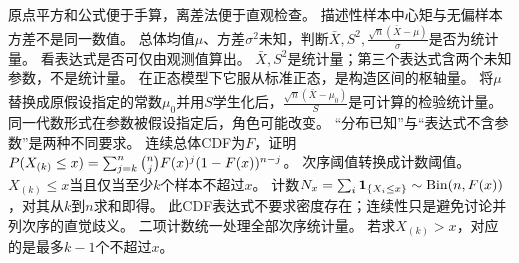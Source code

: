 {原点平方和公式便于手算，离差法便于直观检查。}
{描述性样本中心矩与无偏样本方差不是同一数值。}
{总体均值$\mu$、方差$\sigma^2$未知，判断$\bar X,S^2,\frac{\sqrt n(\bar X-\mu)}{\sigma}$是否为统计量。}
{看表达式是否可仅由观测值算出。}
{$\bar X,S^2$是统计量；第三个表达式含两个未知参数，不是统计量。
在正态模型下它服从标准正态，是构造区间的枢轴量。
将$\mu$替换成原假设指定的常数$\mu_0$并用$S$学生化后，$\frac{\sqrt n(\bar X-\mu_0)}{S}$是可计算的检验统计量。}
{同一代数形式在参数被假设指定后，角色可能改变。}
{“分布已知”与“表达式不含参数”是两种不同要求。}
{连续总体CDF为$F$，证明$P(X_{(k)}\le x)=\sum_{j=k}^n\binom njF(x)^j(1-F(x))^{n-j}$。}
{次序阈值转换成计数阈值。}
{$X_{(k)}\le x$当且仅当至少$k$个样本不超过$x$。
计数$N_x=\sum_i\mathbf1_{\{X_i\le x\}}\sim\operatorname{Bin}(n,F(x))$，对其从$k$到$n$求和即得。
此CDF表达式不要求密度存在；连续性只是避免讨论并列次序的直觉歧义。}
{二项计数统一处理全部次序统计量。}
{若求$X_{(k)}>x$，对应的是最多$k-1$个不超过$x$。}

